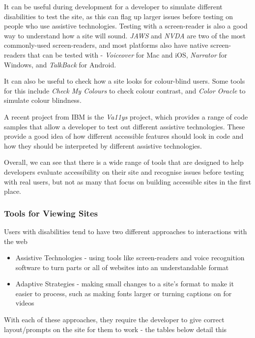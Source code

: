 \documentclass[ %
                    author={Aleena Baig},
                supervisor={Dr Simon Lock},
                    degree={BSc},
                     title={On Making Web Accessible Graphs},
                  subtitle={},
                      year={2019} ]{dissertation}
\begin{document}
It can be useful during development for a developer to simulate different disabilities to test the site, as this can flag up larger issues before testing on people who use assistive technologies. Testing with a screen-reader is also a good way to understand how a site will sound. \textit{JAWS} and \textit{NVDA} are two of the most commonly-used screen-readers, and most platforms also have native screen-readers that can be tested with - \textit{Voiceover} for Mac and iOS, \textit{Narrator} for Windows, and \textit{TalkBack} for Android.

It can also be useful to check how a site looks for colour-blind users. Some tools for this include \textit{Check My Colours} to check colour contrast, and \textit{Color Oracle} to simulate colour blindness.

A recent project from IBM is the \textit{Va11ys} project, which provides a range of code samples that allow a developer to test out different assistive technologies. These provide a good idea of how different accessible features should look in code and how they should be interpreted by different assistive technologies.

Overall, we can see that there is a wide range of tools that are designed to help developers evaluate accessibility on their site and recognise issues before testing with real users, but not as many that focus on building accessible sites in the first place.


\subsubsection{Tools for Viewing Sites}

Users with disabilities tend to have two different approaches to interactions with the web

\begin{itemize}
    \item Assistive Technologies - using tools like screen-readers and voice recognition software to turn parts or all of websites into an understandable format
    \item Adaptive Strategies - making small changes to a site's format to make it easier to process, such as making fonts larger or turning captions on for videos
\end{itemize}

With each of these approaches, they require the developer to give correct layout/prompts on the site for them to work - the tables below detail this
\end{document}
